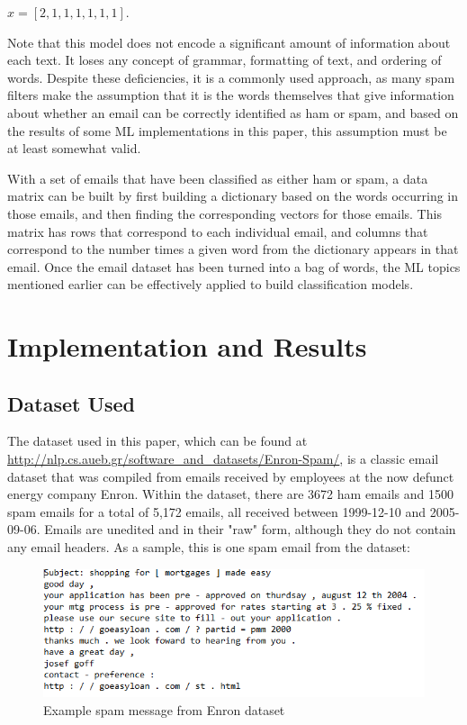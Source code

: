 \documentclass{article}
\begin{document}
\begin{center}
$x = [2,1,1,1,1,1,1].$
\end{center}

Note that this model does not encode a significant amount of information about each text. It loses any concept of grammar, formatting of text, and ordering of words. Despite these deficiencies, it is a commonly used approach, as many spam filters make the assumption that it is the words themselves that give information about whether an email can be correctly identified as ham or spam, and based on the results of some ML implementations in this paper, this assumption must be at least somewhat valid.


With a set of emails that have been classified as either ham or spam, a data matrix can be built by first building a dictionary based on the words occurring in those emails, and then finding the corresponding vectors for those emails. This matrix has rows that correspond to each individual email, and columns that correspond to the number times a given word from the dictionary appears in that email. Once the email dataset has been turned into a bag of words, the ML topics mentioned earlier can be effectively applied to build classification models.



\section{Implementation and Results}
\subsection{Dataset Used}
The dataset used in this paper, which can be found at \url{http://nlp.cs.aueb.gr/software_and_datasets/Enron-Spam/},  is a classic email dataset that was compiled from emails received by employees at the now defunct energy company Enron. Within the dataset, there are 3672 ham emails and 1500 spam emails for a total of 5,172 emails, all received between 1999-12-10 and 2005-09-06. Emails are unedited and in their "raw" form, although they do not contain any email headers. As a sample, this is one spam email from the dataset:


\begin{figure}[h]
\includegraphics[scale=0.75]{spam_example.PNG}
\caption{Example spam message from Enron dataset}
\centering
\end{figure}
\end{document}
